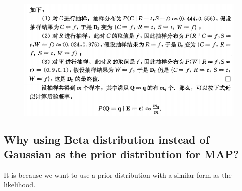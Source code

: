 \documentclass{article}
\begin{document}
\begin{figure}[h]
    \centering
    \includegraphics[width=1.05\columnwidth]{figs/mcmc3.png}
\end{figure}

\subsection{Why using Beta distribution instead of Gaussian as the prior distribution for MAP?}
It is because we want to use a prior distribution with a similar form as the likelihood.
\end{document}
